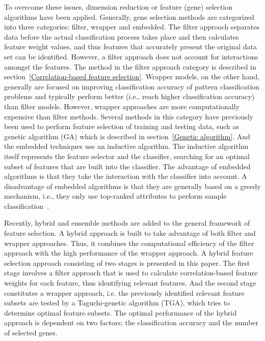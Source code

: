 \documentclass[runningheads]{llncs}
\begin{document}
To overcome these issues, dimension reduction or feature (gene) selection algorithms have been applied. Generally, gene selection methods are categorized into three categories: filter, wrapper and embedded. The filter approach separates data before the actual classification process takes place and then calculates feature weight values, and thus features that accurately present the original data set can be identified. However, a filter approach does not account for interactions amongst the features. The method in the filter approach category is described in section~\ref{Correlation-based feature selection}. Wrapper models, on the other hand, generally are focused on improving classification accuracy of pattern classification problems and typically perform better (i.e., reach higher classification accuracy) than filter models. However, wrapper approaches are more computationally expensive than filter methods. Several methods in this category have previously been used to perform feature selection of training and testing data, such as genetic algorithm (GA) which is described in section~\ref{Genetic algorithm}. And the embedded techniques use an inductive algorithm. The inductive algorithm itself represents the feature selector and the classifier, searching for an optimal subset of features that are built into the classifier. The advantage of embedded algorithms is that they take the interaction with the classifier into account. A disadvantage of embedded algorithms is that they are generally based on a greedy mechanism, i.e., they only use top-ranked attributes to perform sample classification~\cite{saeys2007review,yang2010multi}.

Recently, hybrid and ensemble methods are added to the general framework of feature selection. A hybrid approach is built to take advantage of both filter and wrapper approaches. Thus, it combines the computational efficiency of the filter approach with the high performance of the wrapper approach. A hybrid feature selection approach consisting of two stages is presented in this paper. The first stage involves a filter approach that is used to calculate correlation-based feature weights for each feature, thus identifying relevant features. And the second stage constitutes a wrapper approach, i.e. the previously identified relevant feature subsets are tested by a Taguchi-genetic algorithm (TGA), which tries to determine optimal feature subsets. The optimal performance of the hybrid approach is dependent on two factors; the classification accuracy and the number of selected genes.
\end{document}
